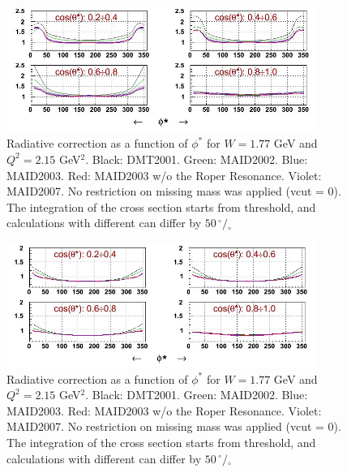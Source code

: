 \vspace{0.5cm}
\begin{figure}[h]
  \centering
                \includegraphics[width=0.90\textwidth ]{img/rad_cor_phi_vcut0.jpg}
                \caption{Radiative correction as a function of
	             $\phi^*$ for $W=1.77$ GeV and $Q^2=2.15$ GeV$^2$. Black: DMT2001.
                Green: MAID2002. Blue: MAID2003. Red: MAID2003 w/o the Roper Resonance.
                Violet:  MAID2007.
                No restriction on missing mass was applied (vcut = 0).
                The integration of the cross section starts from threshold,
                and calculations with different can differ by $50  \,^{\circ\!\!}/\!_\circ$}
                \label{fig:vcut_0}
\end{figure}


\vspace{0.5cm}
\begin{figure}[h]
  \centering
                \includegraphics[width=0.90\textwidth ]{img/rad_cor_phi_vcut06.jpg}
                \caption{Radiative correction as a function of
	             $\phi^*$ for $W=1.77$ GeV and $Q^2=2.15$ GeV$^2$. Black: DMT2001.
                Green: MAID2002. Blue: MAID2003. Red: MAID2003 w/o the Roper Resonance.
                Violet:  MAID2007.
                No restriction on missing mass was applied (vcut = 0).
                The integration of the cross section starts from threshold,
                and calculations with different can differ by $50  \,^{\circ\!\!}/\!_\circ$}
                \label{fig:vcut_06}
\end{figure}



